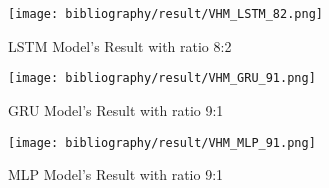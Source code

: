 \documentclass{ieeeojies}
\begin{document}
	\begin{figure}[H]
		\centering
		\begin{minipage}{0.9\linewidth}
			\centering
			\texttt{[image: bibliography/result/VHM\_LSTM\_82.png]}
			\caption{LSTM Model's Result with ratio 8:2}
			\label{fig1.6}
		\end{minipage}
	\end{figure}
	\begin{figure}[H]
		\centering
		\begin{minipage}{0.9\linewidth}
			\centering
			\texttt{[image: bibliography/result/VHM\_GRU\_91.png]}
			\caption{GRU Model's Result with ratio 9:1}
			\label{fig1.7}
		\end{minipage}
	\end{figure}
	\begin{figure}[H]
		\centering
		\begin{minipage}{0.9\linewidth}
			\centering
			\texttt{[image: bibliography/result/VHM\_MLP\_91.png]}
			\caption{MLP Model's Result with ratio 9:1}
			\label{fig1.8}
		\end{minipage}
	\end{figure}
	
\end{document}
